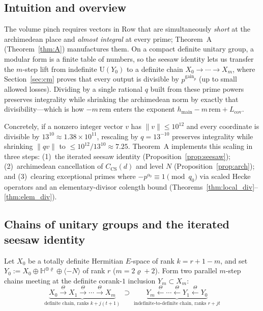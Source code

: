 \documentclass[11pt]{amsart}
\newcommand{\Ugrp}{\mathrm{U}}
\newcommand{\Row}{\mathrm{Row}}
\newcommand{\hmain}{h_{\mathrm{main}}}
\newcommand{\rem}{\mathrm{rem}}
\theoremstyle{definition}
\theoremstyle{remark}
\begin{document}
\subsection{Intuition and overview}
The volume pinch requires vectors in $\Row$ that are simultaneously \emph{short} at the archimedean place and \emph{almost integral} at every prime; Theorem~A (Theorem~\ref{thm:A}) manufactures them. On a compact definite unitary group, a modular form is a finite table of numbers, so the seesaw identity lets us transfer the $m$-step lift from indefinite $\Ugrp(Y_0)$ to a definite chain $X_0\to\cdots\to X_m$, where Section~\ref{sec:cm} proves that every output is divisible by $p^{\mathrm{gain}_p}$ (up to small allowed losses). Dividing by a single rational $q$ built from these prime powers preserves integrality while shrinking the archimedean norm by exactly that divisibility---which is how $-m\,\rem$ enters the exponent $\hmain-m\,\rem+L_{\mathrm{cov}}$.

Concretely, if a nonzero integer vector $v$ has $\|v\|\le 10^{12}$ and every coordinate is divisible by $13^{10}\approx 1.38\times 10^{11}$, rescaling by $q=13^{-10}$ preserves integrality while shrinking $\|q v\|$ to $\le 10^{12}/13^{10}\approx 7.25$. Theorem~A implements this scaling in three steps: (1)~the iterated seesaw identity (Proposition~\ref{prop:seesaw}); (2)~archimedean cancellation of $C_{\mathrm{CS}}(d)$ and level $N$ (Proposition~\ref{prop:arch}); and (3)~clearing exceptional primes where $-p^{o_0}\equiv 1\pmod{q_0}$ via scaled Hecke operators and an elementary-divisor colength bound (Theorems~\ref{thm:local_div}--\ref{thm:elem_div}).

\subsection{Chains of unitary groups and the iterated seesaw identity}
Let $X_0$ be a totally definite Hermitian $E$-space of rank $k=r+1-m$, and set $Y_0:=X_0\oplus\mathbb{H}^{\oplus\varrho}\oplus\langle -N\rangle$ of rank $r$ ($m=2\varrho+2$). Form two parallel $m$-step chains meeting at the definite corank-$1$ inclusion $Y_m\subset X_m$:
\[
 \underbrace{X_0 \xrightarrow{\;\Theta\;} X_1 \xrightarrow{\;\Theta\;} \cdots \xrightarrow{\;\Theta\;} X_m}_{\text{definite chain, ranks }k+j(t+1)}
 \;\supset\;
 \underbrace{Y_m \xleftarrow{\;\Theta\;} \cdots \xleftarrow{\;\Theta\;} Y_1 \xleftarrow{\;\Theta\;} Y_0}_{\text{indefinite-to-definite chain, ranks }r+jt}
\]
\end{document}
